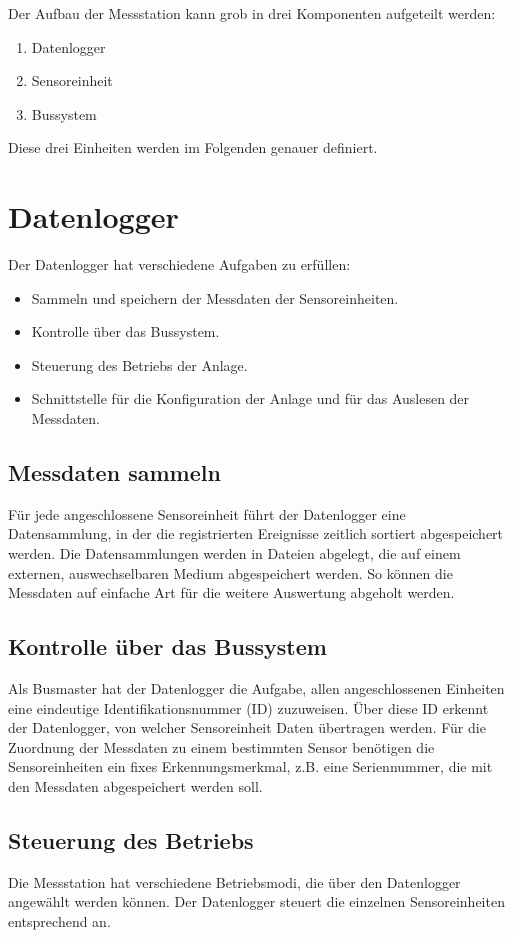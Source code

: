 Der Aufbau der Messstation kann grob in drei Komponenten aufgeteilt werden:
\begin{enumerate}
\item Datenlogger
\item Sensoreinheit
\item Bussystem
\end{enumerate}

Diese drei Einheiten werden im Folgenden genauer definiert.

\section{Datenlogger}
Der Datenlogger hat verschiedene Aufgaben zu erfüllen:
\begin{itemize}
\item Sammeln und speichern der Messdaten der Sensoreinheiten.
\item Kontrolle über das Bussystem.
\item Steuerung des Betriebs der Anlage.
\item Schnittstelle für die Konfiguration der Anlage und für das Auslesen der Messdaten.
\end{itemize}


\subsection{Messdaten sammeln}
Für jede angeschlossene Sensoreinheit führt der Datenlogger eine Datensammlung, in der die registrierten Ereignisse zeitlich sortiert abgespeichert werden. Die Datensammlungen werden in Dateien abgelegt, die auf einem externen, auswechselbaren Medium abgespeichert werden. So können die Messdaten auf einfache Art für die weitere Auswertung abgeholt werden.


\subsection{Kontrolle über das Bussystem}
Als Busmaster hat der Datenlogger die Aufgabe, allen angeschlossenen Einheiten eine eindeutige Identifikationsnummer (ID) zuzuweisen. Über diese ID erkennt der Datenlogger, von welcher Sensoreinheit Daten übertragen werden. Für die Zuordnung der Messdaten zu einem bestimmten Sensor benötigen die Sensoreinheiten ein fixes Erkennungsmerkmal, z.B. eine Seriennummer, die mit den Messdaten abgespeichert werden soll.


\subsection{Steuerung des Betriebs}
Die Messstation hat verschiedene Betriebsmodi, die über den Datenlogger angewählt werden können. Der Datenlogger steuert die einzelnen Sensoreinheiten entsprechend an.


